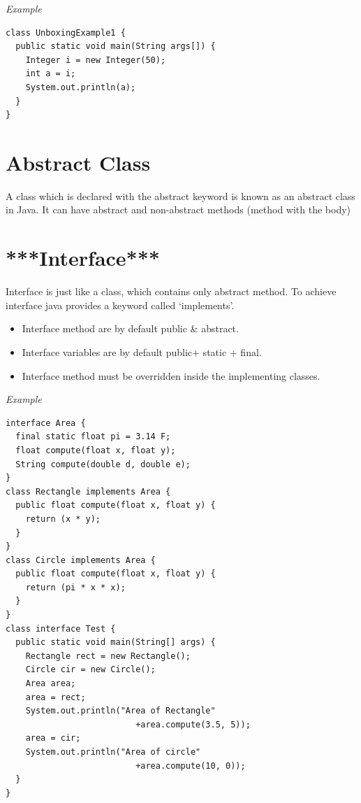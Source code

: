 \documentclass[twocolumn, a4paper]{article}
\begin{document}
\noindent\emph{Example}
\begin{lstlisting}
class UnboxingExample1 {
  public static void main(String args[]) {
    Integer i = new Integer(50);
    int a = i;
    System.out.println(a);
  }
}
\end{lstlisting}

\section{Abstract Class}
A class which is declared with the abstract keyword is known as an abstract
class in Java. It can have abstract and non-abstract methods (method with the
body)

\section{***Interface***}
Interface is just like a class, which contains only abstract method. To
achieve interface java provides a keyword called `implements'.
\begin{itemize}
  \item Interface method are by default public \& abstract.
  \item Interface variables are by default public+ static + final.
  \item Interface method must be overridden inside the implementing classes.
\end{itemize}

\noindent\emph{Example}
\begin{lstlisting}
interface Area {
  final static float pi = 3.14 F;
  float compute(float x, float y);
  String compute(double d, double e);
}
class Rectangle implements Area {
  public float compute(float x, float y) {
    return (x * y);
  }
}
class Circle implements Area {
  public float compute(float x, float y) {
    return (pi * x * x);
  }
}
class interface Test {
  public static void main(String[] args) {
    Rectangle rect = new Rectangle();
    Circle cir = new Circle();
    Area area;
    area = rect;
    System.out.println("Area of Rectangle"
                          +area.compute(3.5, 5));
    area = cir;
    System.out.println("Area of circle"
                          +area.compute(10, 0));
  }
}
\end{lstlisting}
\end{document}
